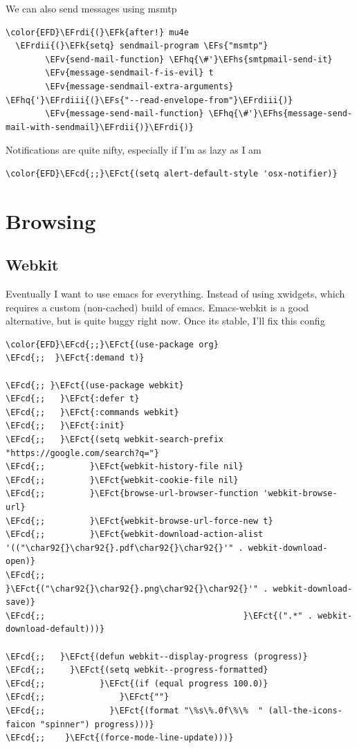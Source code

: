 \documentclass{scrartcl}
\newcommand{\EFk}[1]{\textcolor{EFk}{#1}} %
\newcommand{\EFs}[1]{\textcolor{EFs}{#1}} %
\newcommand{\EFct}[1]{\textcolor{EFct}{#1}} %
\newcommand{\EFv}[1]{\textcolor{EFv}{#1}} %
\newcommand{\EFcd}[1]{\textcolor{EFcd}{#1}} %
\newcommand{\EFhq}[1]{#1} %
\newcommand{\EFhs}[1]{#1} %
\newcommand{\EFrdi}[1]{#1} %
\newcommand{\EFrdii}[1]{#1} %
\newcommand{\EFrdiii}[1]{#1} %
\begin{document}
We can also send messages using msmtp
\begin{Code}
\begin{Verbatim}[]
\color{EFD}\EFrdi{(}\EFk{after!} mu4e
  \EFrdii{(}\EFk{setq} sendmail-program \EFs{"msmtp"}
        \EFv{send-mail-function} \EFhq{\#'}\EFhs{smtpmail-send-it}
        \EFv{message-sendmail-f-is-evil} t
        \EFv{message-sendmail-extra-arguments} \EFhq{'}\EFrdiii{(}\EFs{"--read-envelope-from"}\EFrdiii{)}
        \EFv{message-send-mail-function} \EFhq{\#'}\EFhs{message-send-mail-with-sendmail}\EFrdii{)}\EFrdi{)}
\end{Verbatim}
\end{Code}

Notifications are quite nifty, especially if I'm as lazy as I am
\begin{Code}
\begin{Verbatim}[]
\color{EFD}\EFcd{;;}\EFct{(setq alert-default-style 'osx-notifier)}
\end{Verbatim}
\end{Code}

\section{Browsing}
\label{sec:orgc5b33df}
\subsection{Webkit}
\label{sec:org3a61881}
Eventually I want to use emacs for everything. Instead of using xwidgets, which
requires a custom (non-cached) build of emacs. Emacs-webkit is a good
alternative, but is quite buggy right now. Once its stable, I'll fix this config
\begin{Code}
\begin{Verbatim}[]
\color{EFD}\EFcd{;;}\EFct{(use-package org}
\EFcd{;;  }\EFct{:demand t)}

\EFcd{;; }\EFct{(use-package webkit}
\EFcd{;;   }\EFct{:defer t}
\EFcd{;;   }\EFct{:commands webkit}
\EFcd{;;   }\EFct{:init}
\EFcd{;;   }\EFct{(setq webkit-search-prefix "https://google.com/search?q="}
\EFcd{;;         }\EFct{webkit-history-file nil}
\EFcd{;;         }\EFct{webkit-cookie-file nil}
\EFcd{;;         }\EFct{browse-url-browser-function 'webkit-browse-url}
\EFcd{;;         }\EFct{webkit-browse-url-force-new t}
\EFcd{;;         }\EFct{webkit-download-action-alist '(("\char92{}\char92{}.pdf\char92{}\char92{}'" . webkit-download-open)}
\EFcd{;;                                        }\EFct{("\char92{}\char92{}.png\char92{}\char92{}'" . webkit-download-save)}
\EFcd{;;                                        }\EFct{(".*" . webkit-download-default)))}

\EFcd{;;   }\EFct{(defun webkit--display-progress (progress)}
\EFcd{;;     }\EFct{(setq webkit--progress-formatted}
\EFcd{;;           }\EFct{(if (equal progress 100.0)}
\EFcd{;;               }\EFct{""}
\EFcd{;;             }\EFct{(format "\%s\%.0f\%\%  " (all-the-icons-faicon "spinner") progress)))}
\EFcd{;;    }\EFct{(force-mode-line-update)))}
\end{Verbatim}
\end{Code}
\end{document}
